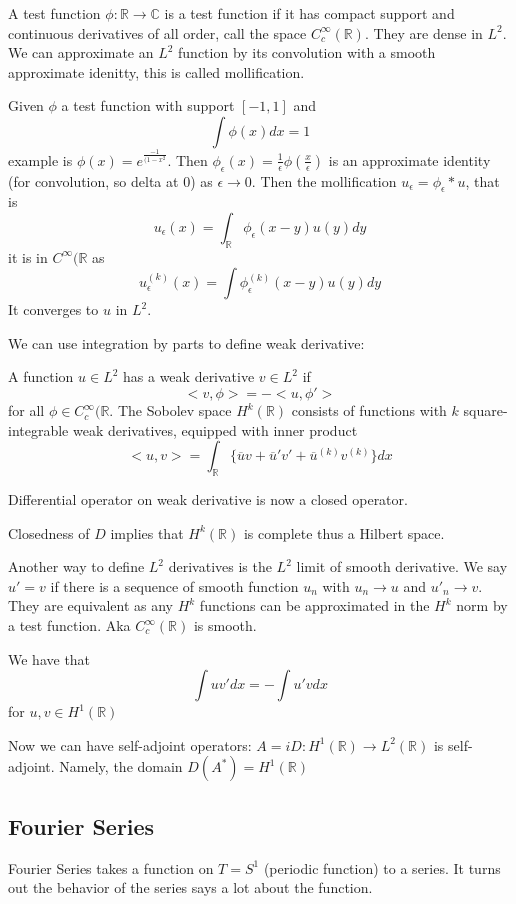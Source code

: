 \documentclass[main.tex]{subfiles}
\begin{document}
A test function $\phi: \mathbb{R} \rightarrow \mathbb{C}$ is a test function if it has compact support and continuous derivatives of all order, call the space $C^\infty _c(\mathbb{R})$. They are dense in $L^2$. We can approximate an $L^2$ function by its convolution with a smooth approximate idenitty, this is called mollification.

Given $\phi$ a test function with support $[-1, 1]$ and 
$$
\int \phi(x) dx = 1
$$
example is $\phi(x) = e^{\frac{-1}{(1-x^2}}$. 
Then $\phi_\epsilon(x) = \frac{1}{\epsilon} \phi(\frac{x}{\epsilon})$ is an approximate identity (for convolution, so delta at $0$) as $\epsilon \rightarrow 0$.  Then the mollification $u_\epsilon = \phi_\epsilon * u$, that is 
$$
u_\epsilon(x) = \int_\mathbb{R} \phi_\epsilon(x-y) u(y) dy
$$
it is in $C^\infty(\mathbb{R}$ as 
$$
u^{(k)} _\epsilon (x) = \int \phi^{(k)} _\epsilon (x-y) u(y) dy
$$
It converges to $u$ in $L^2$.

We can use integration by parts to define weak derivative:

\begin{theorem}
A function $u \in L^2$ has a weak derivative $v \in L^2$ if 
$$
<v, \phi> = -<u, \phi'> 
$$ for all $\phi \in C^\infty _c (\mathbb{R}$. 
The Sobolev space $H^k(\mathbb{R})$ consists of functions with $k$ square-integrable weak derivatives, equipped with inner product
$$
<u,v> = \int_\mathbb{R} \{\overline{u}v + \overline{u}' v' + \overline{u}^{(k)} v^{(k)} \} dx
$$
\end{theorem}

Differential operator on weak derivative is now a closed operator.

Closedness of $D$ implies that $H^k(\mathbb{R})$ is complete thus a Hilbert space.

Another way to define $L^2$ derivatives is the $L^2$ limit of smooth derivative. We say $u' = v$ if there is a sequence of smooth function $u_n$ with $u_n \rightarrow u$ and $u' _n \rightarrow v$. They are equivalent as any $H^k$ functions can be approximated in the $H^k$ norm by a test function. Aka $C^\infty _c (\mathbb{R})$ is smooth.

We have that 
$$
\int u v' dx = - \int u' v dx
$$
for $u, v \in H^1(\mathbb{R})$

Now we can have self-adjoint operators: $A = iD: H^1(\mathbb{R}) \rightarrow L^2(\mathbb{R})$ is self-adjoint. Namely, the domain $D(A^*) = H^1(\mathbb{R})$




\subsection{Fourier Series}
Fourier Series takes a function on $T = S^1$ (periodic function) to a series. It turns out the behavior of the series says a lot about the function.
\end{document}
